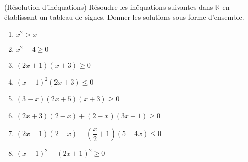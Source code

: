\documentclass[12pt,
addpoints,
fleqn
]{exam}
\begin{document}
\begin{questions}
\begin{solution}
\begin{parts}
            \part $\dfrac{4\sqrt{8}x+1}{5}> \dfrac{3\sqrt{2}}{4}x \iff \dfrac{4\sqrt{8}x}{5} - \dfrac{3\sqrt{2}x}{4} > \dfrac{-1}{5} \iff \left(\dfrac{4\times 2\sqrt{2}}{5}-\dfrac{3\sqrt{2}}{4}\right)x > \dfrac{-1}{5} \iff \left(\dfrac{32\sqrt{2}}{20}-\dfrac{15\sqrt{2}}{20}\right)x > \dfrac{-1}{5} \iff \dfrac{17\sqrt{2}}{20}x > -\dfrac{1}{5} \iff x > \dfrac{-1}{5}\times\dfrac{20}{17\sqrt{2}} \iff x > \dfrac{-4}{17\sqrt{2}}$. Alors,  $\boxed{S=]-\dfrac{-4}{17\sqrt{2}} ; +\infty[ }$.

        \end{parts}

    \end{solution}


    \question (Résolution d'inéquations) Résoudre les inéquations suivantes dans $\mathbb{R}$ en établissant un tableau de signes. Donner les solutions sous forme d'ensemble.

    \begin{multicols}{2}
        \begin{enumerate}[(1)]
            \item $x^2 > x$
            \item $x^2 - 4 \geq 0$
            \item $(2x+1)(x+3) \geq 0$
            \item $(x+1)^2(2x+3) \leq 0$
            \item $(3-x)(2x+5)(x+3) \geq 0$
            \item $(2x+3)(2-x) + (2-x)(3x-1) \geq 0$
            \item $(2x-1)(2-x)-\left(\dfrac{x}{2}+1\right)(5-4x) \leq 0$
            \item $(x-1)^2-(2x+1)^2 \geq 0$
        \end{enumerate}
    \end{multicols}

    \begin{solution}
        \begin{parts}

\end{parts}
\end{solution}
\end{questions}
\end{document}
